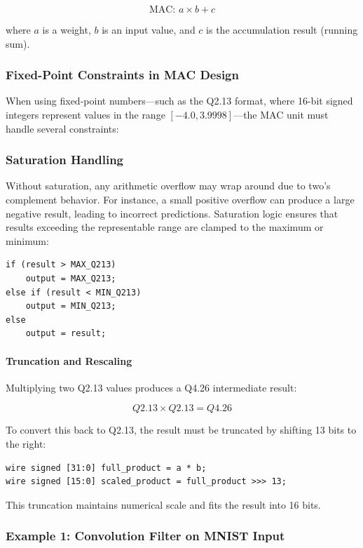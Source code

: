 \documentclass{article}
\begin{document}
\[
\text{MAC: } a \times b + c
\]

where $a$ is a weight, $b$ is an input value, and $c$ is the accumulation result (running sum).

\subsubsection*{Fixed-Point Constraints in MAC Design}

When using fixed-point numbers—such as the Q2.13 format, where 16-bit signed integers represent values in the range $[-4.0, 3.9998]$—the MAC unit must handle several constraints:

\subsubsection{Saturation Handling} 
Without saturation, any arithmetic overflow may wrap around due to two's complement behavior. For instance, a small positive overflow can produce a large negative result, leading to incorrect predictions. Saturation logic ensures that results exceeding the representable range are clamped to the maximum or minimum:

\begin{verbatim}
if (result > MAX_Q213)
    output = MAX_Q213;
else if (result < MIN_Q213)
    output = MIN_Q213;
else
    output = result;
\end{verbatim}

\paragraph{Truncation and Rescaling} Multiplying two Q2.13 values produces a Q4.26 intermediate result:

\[
Q2.13 \times Q2.13 = Q4.26
\]

To convert this back to Q2.13, the result must be truncated by shifting 13 bits to the right:

\begin{verbatim}
wire signed [31:0] full_product = a * b;
wire signed [15:0] scaled_product = full_product >>> 13;
\end{verbatim}

This truncation maintains numerical scale and fits the result into 16 bits.

\subsubsection*{Example 1: Convolution Filter on MNIST Input}
\end{document}

